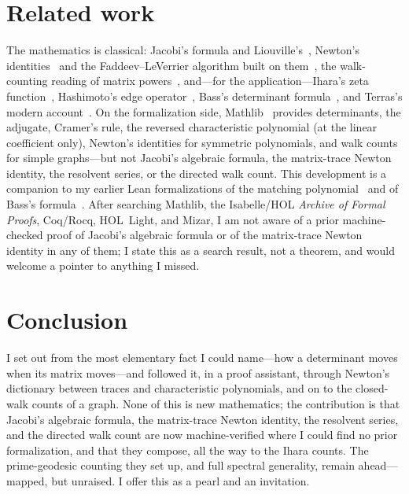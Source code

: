 \documentclass[11pt]{article}
\begin{document}
\section{Related work}
\label{sec:related}

The mathematics is classical: Jacobi's formula and Liouville's~\cite{HornJohnson,MagnusNeudecker},
Newton's identities~\cite{Macdonald} and the Faddeev--LeVerrier algorithm built on them~\cite{Hou1998},
the walk-counting reading of matrix powers~\cite{BrouwerHaemers}, and---for the
application---Ihara's zeta function~\cite{Ihara1966}, Hashimoto's edge operator~\cite{Hashimoto1989},
Bass's determinant formula~\cite{Bass1992}, and Terras's modern account~\cite{Terras2011}. On the
formalization side, Mathlib~\cite{Mathlib2020} provides determinants, the adjugate, Cramer's rule,
the reversed characteristic polynomial (at the linear coefficient only), Newton's identities for
symmetric polynomials, and walk counts for simple graphs---but not Jacobi's algebraic formula, the
matrix-trace Newton identity, the resolvent series, or the directed walk count. This development is a
companion to my earlier Lean formalizations of the matching polynomial~\cite{PartI,PartII} and of
Bass's formula~\cite{IharaBass}. After searching Mathlib, the Isabelle/HOL \emph{Archive of Formal
Proofs}, Coq/Rocq, HOL~Light, and Mizar, I am not aware of a prior machine-checked proof of
Jacobi's algebraic formula or of the matrix-trace Newton identity in any of them; I state this as a
search result, not a theorem, and would welcome a pointer to anything I missed.

\section{Conclusion}

I set out from the most elementary fact I could name---how a determinant moves when its matrix
moves---and followed it, in a proof assistant, through Newton's dictionary between traces and
characteristic polynomials, and on to the closed-walk counts of a graph. None of this is new
mathematics; the contribution is that Jacobi's algebraic formula, the matrix-trace Newton identity,
the resolvent series, and the directed walk count are now machine-verified where I could find no
prior formalization, and that they compose, all the way to the Ihara counts. The prime-geodesic
counting they set up, and full spectral generality, remain ahead---mapped, but unraised. I offer this
as a pearl and an invitation.
\end{document}
